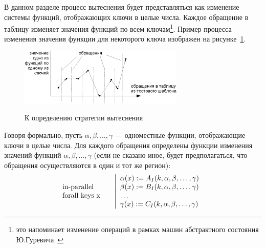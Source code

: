 \begin{enumerate}

В данном разделе процесс вытеснения будет представляться как изменение  системы функций, отображающих ключи в целые числа. Каждое обращение в таблицу изменяет значения функций по всем ключам\footnote{это напоминает изменение операций в рамках машин абстрактного состояния Ю.Гуревича~\cite{ASM}}. Пример процесса изменения значения функции для некоторого ключа изображен на рисунке~\ref{fig:graphic}.

\begin{figure}[h] \center
  \includegraphics[width=0.7\textwidth]{2.theor/graphic}\\
  \caption{К определению стратегии вытеснения}\label{fig:graphic}
\end{figure}

Говоря формально, пусть $\alpha, \beta, \dots, \gamma$ --- одноместные функции,
отображающие ключи в целые числа. Для каждого обращения определены функции
изменения значений функций $\alpha, \beta, \dots, \gamma$ (если не сказано иное, будет предполагаться, что обращения осуществляются в один и тот же регион):
$$\parbox{2.5cm}{in-parallel\\forall keys x~}\left|\begin{array}{l}
\alpha(x) := A_I(k, \alpha, \beta, \dots, \gamma)\\
\beta(x) := B_I(k, \alpha, \beta, \dots, \gamma)\\
\dots\\
\gamma(x) := C_I(k, \alpha, \beta, \dots, \gamma)\\
\end{array}\right.
$$


\end{enumerate}
